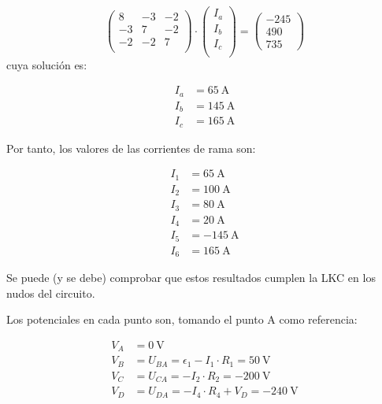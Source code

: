 \documentclass[10pt]{article}
\begin{document}
\[
  \left(\begin{array}{ccc}
          8 & -3 & -2 \\
          -3 & 7 & -2 \\
          -2 & -2 & 7\\
        \end{array}\right)%
      \cdot \left(\begin{array}{c}
              I_a\\
              I_b\\
              I_c\\
            \end{array}\right)%
            = \left(\begin{array}{c}
              -245\\
              490\\
              735
            \end{array}\right)
\]
cuya solución es:

\begin{align*}
  I_a &= \SI{65}{\ampere}\\
  I_b &= \SI{145}{\ampere}\\
  I_c &= \SI{165}{\ampere}
\end{align*}

Por tanto, los valores de las corrientes de rama son:

\begin{align*}
  I_1 &= \SI{65}{\ampere}\\
  I_2 &= \SI{100}{\ampere}\\
  I_3 &= \SI{80}{\ampere}\\
  I_4 &= \SI{20}{\ampere}\\
  I_5 &= \SI{-145}{\ampere}\\
  I_6 &= \SI{165}{\ampere}
\end{align*}

Se puede (y se debe) comprobar que estos resultados cumplen la LKC en los nudos del circuito.

Los potenciales en cada punto son, tomando el punto A como referencia:

\begin{align*}
  V_A &= \SI{0}{\volt}\\
  V_B &= U_{BA} = \epsilon_1 - I_1 \cdot R_1 = \SI{50}{\volt}\\
  V_C &= U_{CA} = - I_2 \cdot R_2 = \SI{-200}{\volt}\\
  V_D &= U_{DA} = -I_4 \cdot R_4 + V_D = \SI{-240}{\volt}
\end{align*}
\end{document}
